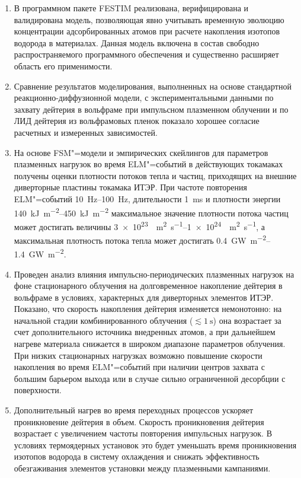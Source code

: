 \begin{enumerate}
  \item В программном пакете FESTIM реализована, верифицирована и валидирована модель, позволяющая явно учитывать временную эволюцию концентрации адсорбированных атомов при расчете накопления изотопов водорода в материалах. Данная модель включена в состав свободно распространяемого программного обеспечения и существенно расширяет область его применимости.
  \item Сравнение результатов моделирования, выполненных на основе стандартной реакционно-диффузионной модели, с экспериментальными данными по захвату дейтерия в вольфраме при импульсном плазменном облучении и по ЛИД дейтерия из вольфрамовых пленок показало хорошее согласие расчетных и измеренных зависимостей.
  \item На основе FSM"=модели и эмпирических скейлингов для параметров плазменных нагрузок во время ELM"=событий в действующих токамаках получены оценки плотности потоков тепла и частиц, приходящих на внешние диверторные пластины токамака ИТЭР. При частоте повторения ELM"=событий \SIrange{10}{100}{\hertz}, длительности \SI{1}{\milli\second} и плотности энергии \SIrange{140}{450}{\kilo\joule\per\meter\squared} максимальное значение плотности потока частиц может достигать величины \SIrange{3e23}{1e24}{\per\meter\squared\per\second}, а максимальная плотность потока тепла может достигать \SIrange{0.4}{1.4}{\giga\watt\per\meter\squared}.
  \item Проведен анализ влияния импульсно-периодических плазменных нагрузок на фоне стационарного облучения на долговременное накопление дейтерия в вольфраме в условиях, характерных для диверторных элементов ИТЭР. Показано, что скорость накопления дейтерия изменяется немонотонно: на начальной стадии комбинированного облучения (\( \lesssim \SI{1}{\second} \)) она возрастает за счет дополнительного источника внедренных атомов, а при дальнейшем нагреве материала снижается в широком диапазоне параметров облучения. При низких стационарных нагрузках возможно повышение скорости накопления во время ELM"=событий при наличии центров захвата с большим барьером выхода или в случае сильно ограниченной десорбции с поверхности.
  \item Дополнительный нагрев во время переходных процессов ускоряет проникновение дейтерия в объем. Скорость проникновения дейтерия возрастает с увеличением частоты повторения импульсных нагрузок. В условиях термоядерных установок это будет уменьшать время проникновения изотопов водорода в систему охлаждения и снижать эффективность обезгаживания элементов установки между плазменными кампаниями.

\end{enumerate}

